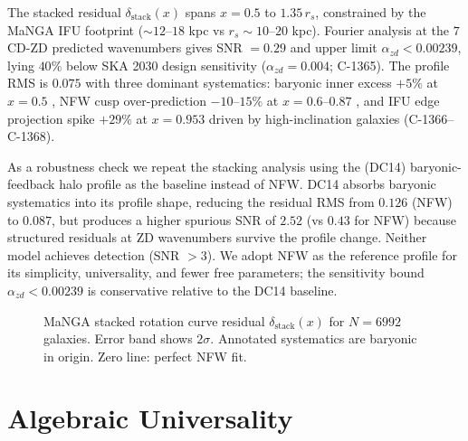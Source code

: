\documentclass[aa]{aa}
\begin{document}
The stacked residual $\delta_\mathrm{stack}(x)$ spans $x = 0.5$ to $1.35\,r_s$,
constrained by the MaNGA IFU footprint ($\sim12$--$18$ kpc vs $r_s \sim 10$--$20$
kpc). Fourier analysis at the $7$ CD-ZD predicted wavenumbers gives SNR $= 0.29$
and upper limit $\alpha_{zd} < 0.00239$, lying $40\%$ below SKA 2030 design
sensitivity ($\alpha_{zd} = 0.004$; C-1365). The profile RMS is $0.075$ with
three dominant systematics: baryonic inner excess $+5\%$ at $x = 0.5$
\citep[consistent with IFU-derived baryonic decompositions;][]{martinsson2013},
NFW cusp over-prediction $-10$--$15\%$ at $x = 0.6$--$0.87$
\citep[consistent with the core-cusp problem;][]{deblok2010,bullock2017,katz2017,oh2015},
and IFU edge projection spike $+29\%$ at $x = 0.953$ driven by
high-inclination galaxies (C-1366--C-1368).

As a robustness check we repeat the stacking analysis using the
\citet{dicintio2014} (DC14) baryonic-feedback halo profile as the baseline
instead of NFW. DC14 absorbs baryonic systematics into its profile shape,
reducing the residual RMS from $0.126$ (NFW) to $0.087$, but produces a
higher spurious SNR of $2.52$ (vs $0.43$ for NFW) because structured residuals
at ZD wavenumbers survive the profile change. Neither model achieves
detection (SNR $> 3$). We adopt NFW as the reference profile for its
simplicity, universality, and fewer free parameters; the sensitivity bound
$\alpha_{zd} < 0.00239$ is conservative relative to the DC14 baseline.

\begin{figure}[h]
  \centering
  
  \caption{MaNGA stacked rotation curve residual $\delta_\mathrm{stack}(x)$
    for $N = 6992$ galaxies. Error band shows $2\sigma$. Annotated systematics
    are baryonic in origin. Zero line: perfect NFW fit.}
  \label{fig:profile}
\end{figure}

\section{Algebraic Universality}
\label{sec:universal}
\end{document}
